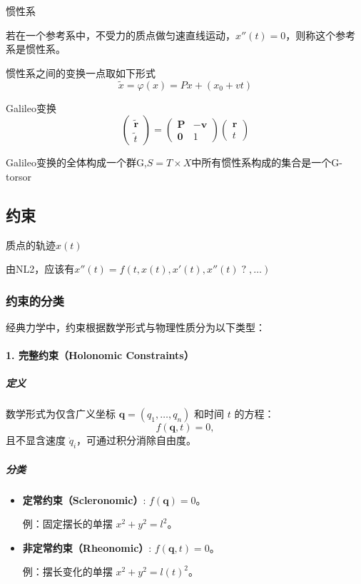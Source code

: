 \documentclass[12pt, a4paper, oneside, UTF8]{ctexbook}  %
\begin{document}
\begin{defn}
    惯性系

    若在一个参考系中，不受力的质点做匀速直线运动，$x''(t)=0$，则称这个参考系是惯性系。
\end{defn}
\begin{thm}
    惯性系之间的变换一点取如下形式
    \[\tilde{x}=\varphi(x)=Px+(x_0+vt)\]
\end{thm}
\begin{corollary}
    Galileo变换
    \[
\begin{pmatrix}
\tilde{\mathbf{r}} \\
\tilde{t}
\end{pmatrix}=
\begin{pmatrix}
\mathbf{P} & -\mathbf{v} \\
\mathbf{0} & 1
\end{pmatrix}
\begin{pmatrix}
\mathbf{r} \\
t
\end{pmatrix}
\]
\end{corollary}
\begin{add}
    Galileo变换的全体构成一个群G,\(S=T\times X\)中所有惯性系构成的集合是一个G-torsor
\end{add}
\subsection{约束}
\begin{proposition}
    质点的轨迹$x(t)$

    由NL2，应该有\(x''(t)=f(t,x(t),x'(t),x''(t)\;?\;,\dots)\)
\end{proposition}
\subsubsection*{约束的分类}
经典力学中，约束根据数学形式与物理性质分为以下类型：

\paragraph*{1. 完整约束（Holonomic Constraints）}
\subparagraph*{定义}
数学形式为仅含广义坐标 \(\mathbf{q} = (q_1, \dots, q_n)\) 和时间 \(t\) 的方程：
\begin{equation}
    f(\mathbf{q}, t) = 0,
\end{equation}
且不显含速度 \(\dot{q}_i\)，可通过积分消除自由度。

\subparagraph*{分类}
\begin{itemize}
    \item \textbf{定常约束（Scleronomic）}: \( f(\mathbf{q}) = 0 \)。\par
    例：固定摆长的单摆 \( x^2 + y^2 = l^2 \)。
    \item \textbf{非定常约束（Rheonomic）}: \( f(\mathbf{q}, t) = 0 \)。\par
    例：摆长变化的单摆 \( x^2 + y^2 = l(t)^2 \)。
\end{itemize}
\end{document}
